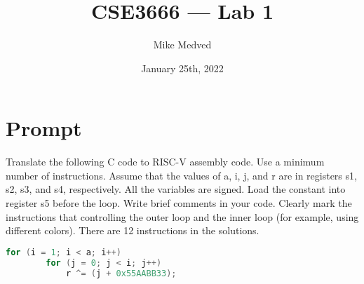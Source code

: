 \documentclass{article}
\title{CSE3666 — Lab 1}
\author{Mike Medved}
\date{January 25th, 2022}
\begin{document}
\maketitle

\section{Prompt}
Translate the following C code to RISC-V assembly code. Use a minimum number of
instructions. Assume that the values of a, i, j, and r are in registers s1, s2, s3, and s4,
respectively. All the variables are signed. Load the constant into register s5 before the loop.
Write brief comments in your code. Clearly mark the instructions that controlling the outer
loop and the inner loop (for example, using different colors). There are 12 instructions in the
solutions.

\hfill
\begin{lstlisting}[language=C]
    for (i = 1; i < a; i++) 
        for (j = 0; j < i; j++) 
            r ^= (j + 0x55AABB33);
\end{lstlisting}
\end{document}
